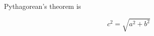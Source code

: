 \documentclass[preview]{standalone}
\begin{document}
\begin{centering}

Pythagorean's theorem is

$$
 	c^2 = \sqrt{a^2 + b^2}
$$

\end{centering}
\end{document}

